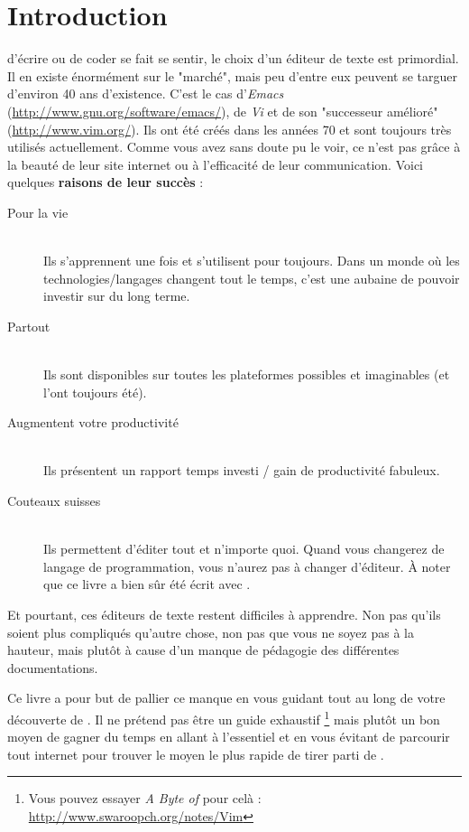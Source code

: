 \chapter*{Introduction}

 d'écrire ou de coder se fait se sentir, le choix d'un éditeur de texte est primordial. Il en existe énormément sur le "marché", mais peu d'entre eux peuvent se targuer d'environ 40 ans d'existence. C'est le cas d'\emph{Emacs} (\url{http://www.gnu.org/software/emacs/}), de \emph{Vi} et de son "successeur amélioré" \vim (\url{http://www.vim.org/}). Ils ont été créés dans les années 70 et sont toujours très utilisés actuellement. Comme vous avez sans doute pu le voir, ce n'est pas grâce à la beauté de leur site internet ou à l'efficacité de leur communication. Voici quelques \textbf{raisons de leur succès} :

\begin{description}
    \item[Pour la vie] \hfill \\ Ils s'apprennent une fois et s'utilisent pour toujours. Dans un monde où les technologies/langages changent tout le temps, c'est une aubaine de pouvoir investir sur du long terme.
    \item[Partout] \hfill \\ Ils sont disponibles sur toutes les plateformes possibles et imaginables (et l'ont toujours été).
    \item[Augmentent votre productivité] \hfill \\ Ils présentent un rapport temps investi / gain de productivité fabuleux.
    \item[Couteaux suisses] \hfill \\ Ils permettent d'éditer tout et n'importe quoi. Quand vous changerez de langage de programmation, vous n'aurez pas à changer d'éditeur. À noter que ce livre a bien sûr été écrit avec \vim.
\end{description}

Et pourtant, ces éditeurs de texte restent difficiles à apprendre. Non pas qu'ils soient plus compliqués qu'autre chose, non pas que vous ne soyez pas à la hauteur, mais plutôt à cause d'un manque de pédagogie des différentes documentations.

Ce livre a pour but de pallier ce manque en vous guidant tout au long de votre découverte de \vim{}. Il ne prétend pas être un guide exhaustif \footnote{Vous pouvez essayer \emph{A Byte of \vim} pour celà : \url{http://www.swaroopch.org/notes/Vim}} mais plutôt un bon moyen de gagner du temps en allant à l'essentiel et en vous évitant de parcourir tout internet pour trouver le moyen le plus rapide de tirer parti de \vim.

